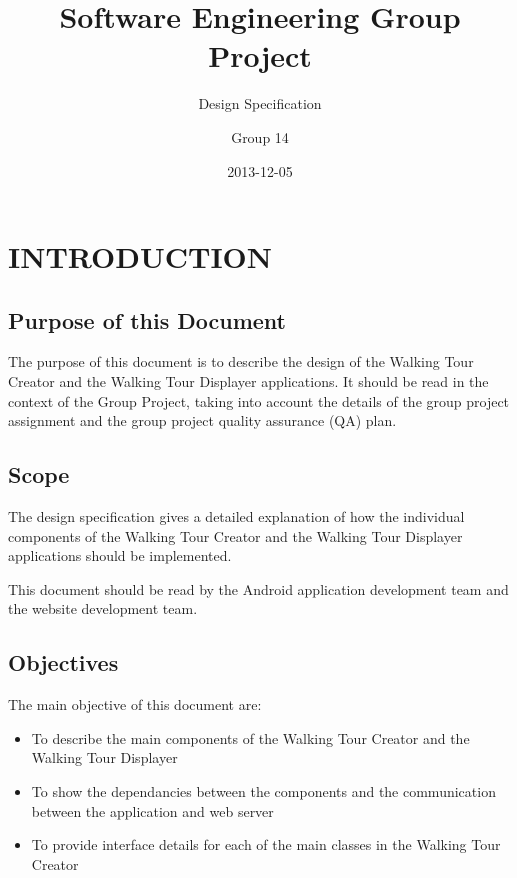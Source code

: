\documentclass{project}
\begin{document}
\title{Software Engineering Group Project}
\subtitle{Design Specification}
\author{Group 14}     
\date{2013-12-05}

\maketitle

\tableofcontents

\newpage

\section{INTRODUCTION}
\subsection{Purpose of this Document}
The purpose of this document is to describe the design of the Walking Tour
Creator and the Walking Tour Displayer applications. It should be read in the
context of the Group Project, taking into account the details of the group
project assignment and the group project quality assurance (QA) plan.
\cite{se.qa.05a} 


\subsection{Scope}
The design specification gives a detailed explanation of how the individual
components of the Walking Tour Creator and the Walking Tour Displayer
applications should be implemented.

This document should be read by the Android application development team and
the website development team.


\subsection{Objectives}

The main objective of this document are:

\begin{itemize}
\item To describe the main components of the Walking Tour Creator and the
Walking Tour Displayer
\item To show the dependancies between the components and the communication
between the application and web server
\item To provide interface details for each of the main classes in the Walking
Tour Creator
\end{itemize}
\end{document}
